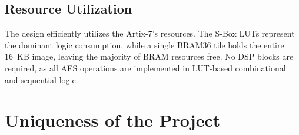 \documentclass[12pt,a4paper]{article}
\begin{document}
\subsection{Resource Utilization}

The design efficiently utilizes the Artix-7's resources. The S-Box LUTs represent the dominant logic consumption, while a single BRAM36 tile holds the entire 16~KB image, leaving the majority of BRAM resources free. No DSP blocks are required, as all AES operations are implemented in LUT-based combinational and sequential logic.


\section{Uniqueness of the Project}
\end{document}
